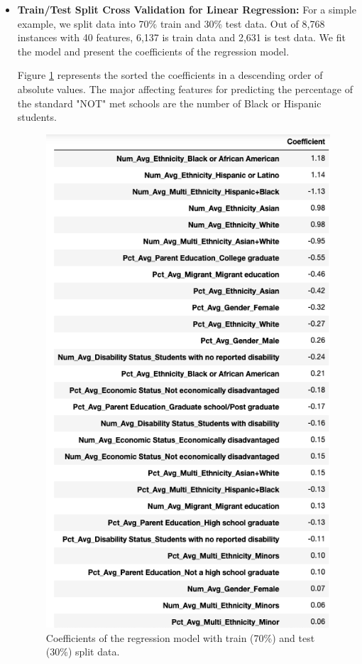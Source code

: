 \documentclass[11pt]{article}
\begin{document}
\begin{itemize}
	\item \textbf{Train/Test Split Cross Validation for Linear Regression:} For a simple example, we split data into 70\% train and 30\% test data. Out of 8,768 instances with 40 features, 6,137 is train data and 2,631 is test data.
% 
We fit the model and present the coefficients of the regression model. 

Figure \ref{fig:reg_coef_traintestsplit} represents the sorted the coefficients in a descending order of absolute values. 
The major affecting features for predicting the percentage of the standard "NOT" met schools are 
the number of Black or Hispanic students.

\begin{figure}[h!]
\centering 
\includegraphics[scale=0.6]{reg_coef_traintestsplit.png}
\caption{Coefficients of the regression model with train (70\%) and test (30\%) split data.}
  \label{fig:reg_coef_traintestsplit}
\end{figure}


\end{itemize}
\end{document}
